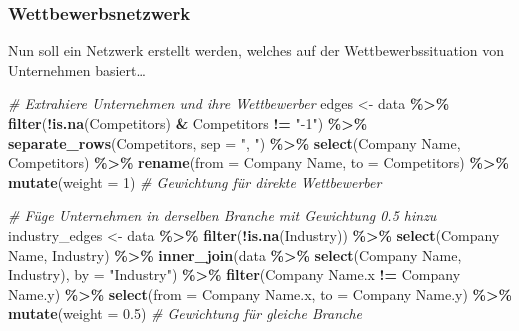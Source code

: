 \documentclass[
]{article}
\newenvironment{Shaded}{\begin{snugshade}}{\end{snugshade}}
\newcommand{\AttributeTok}[1]{\textcolor[rgb]{0.13,0.29,0.53}{#1}}
\newcommand{\CommentTok}[1]{\textcolor[rgb]{0.56,0.35,0.01}{\textit{#1}}}
\newcommand{\DecValTok}[1]{\textcolor[rgb]{0.00,0.00,0.81}{#1}}
\newcommand{\FloatTok}[1]{\textcolor[rgb]{0.00,0.00,0.81}{#1}}
\newcommand{\FunctionTok}[1]{\textcolor[rgb]{0.13,0.29,0.53}{\textbf{#1}}}
\newcommand{\NormalTok}[1]{#1}
\newcommand{\OtherTok}[1]{\textcolor[rgb]{0.56,0.35,0.01}{#1}}
\newcommand{\SpecialCharTok}[1]{\textcolor[rgb]{0.81,0.36,0.00}{\textbf{#1}}}
\newcommand{\StringTok}[1]{\textcolor[rgb]{0.31,0.60,0.02}{#1}}
\begin{document}
\subsubsection{Wettbewerbsnetzwerk}\label{wettbewerbsnetzwerk}

Nun soll ein Netzwerk erstellt werden, welches auf der
Wettbewerbssituation von Unternehmen basiert\ldots{}

\begin{Shaded}
\begin{Highlighting}[]
\CommentTok{\# Extrahiere Unternehmen und ihre Wettbewerber}
\NormalTok{edges }\OtherTok{\textless{}{-}}\NormalTok{ data }\SpecialCharTok{\%\textgreater{}\%}
  \FunctionTok{filter}\NormalTok{(}\SpecialCharTok{!}\FunctionTok{is.na}\NormalTok{(Competitors) }\SpecialCharTok{\&}\NormalTok{ Competitors }\SpecialCharTok{!=} \StringTok{"{-}1"}\NormalTok{) }\SpecialCharTok{\%\textgreater{}\%}
  \FunctionTok{separate\_rows}\NormalTok{(Competitors, }\AttributeTok{sep =} \StringTok{", "}\NormalTok{) }\SpecialCharTok{\%\textgreater{}\%}
  \FunctionTok{select}\NormalTok{(}\StringTok{\textasciigrave{}}\AttributeTok{Company Name}\StringTok{\textasciigrave{}}\NormalTok{, Competitors) }\SpecialCharTok{\%\textgreater{}\%}
  \FunctionTok{rename}\NormalTok{(}\AttributeTok{from =} \StringTok{\textasciigrave{}}\AttributeTok{Company Name}\StringTok{\textasciigrave{}}\NormalTok{, }\AttributeTok{to =}\NormalTok{ Competitors) }\SpecialCharTok{\%\textgreater{}\%}
  \FunctionTok{mutate}\NormalTok{(}\AttributeTok{weight =} \DecValTok{1}\NormalTok{)  }\CommentTok{\# Gewichtung für direkte Wettbewerber}

\CommentTok{\# Füge Unternehmen in derselben Branche mit Gewichtung 0.5 hinzu}
\NormalTok{industry\_edges }\OtherTok{\textless{}{-}}\NormalTok{ data }\SpecialCharTok{\%\textgreater{}\%}
  \FunctionTok{filter}\NormalTok{(}\SpecialCharTok{!}\FunctionTok{is.na}\NormalTok{(Industry)) }\SpecialCharTok{\%\textgreater{}\%}
  \FunctionTok{select}\NormalTok{(}\StringTok{\textasciigrave{}}\AttributeTok{Company Name}\StringTok{\textasciigrave{}}\NormalTok{, Industry) }\SpecialCharTok{\%\textgreater{}\%}
  \FunctionTok{inner\_join}\NormalTok{(data }\SpecialCharTok{\%\textgreater{}\%} \FunctionTok{select}\NormalTok{(}\StringTok{\textasciigrave{}}\AttributeTok{Company Name}\StringTok{\textasciigrave{}}\NormalTok{, Industry), }\AttributeTok{by =} \StringTok{"Industry"}\NormalTok{) }\SpecialCharTok{\%\textgreater{}\%}
  \FunctionTok{filter}\NormalTok{(}\StringTok{\textasciigrave{}}\AttributeTok{Company Name.x}\StringTok{\textasciigrave{}} \SpecialCharTok{!=} \StringTok{\textasciigrave{}}\AttributeTok{Company Name.y}\StringTok{\textasciigrave{}}\NormalTok{) }\SpecialCharTok{\%\textgreater{}\%}
  \FunctionTok{select}\NormalTok{(}\AttributeTok{from =} \StringTok{\textasciigrave{}}\AttributeTok{Company Name.x}\StringTok{\textasciigrave{}}\NormalTok{, }\AttributeTok{to =} \StringTok{\textasciigrave{}}\AttributeTok{Company Name.y}\StringTok{\textasciigrave{}}\NormalTok{) }\SpecialCharTok{\%\textgreater{}\%}
  \FunctionTok{mutate}\NormalTok{(}\AttributeTok{weight =} \FloatTok{0.5}\NormalTok{)  }\CommentTok{\# Gewichtung für gleiche Branche}
\end{Highlighting}
\end{Shaded}
\end{document}
